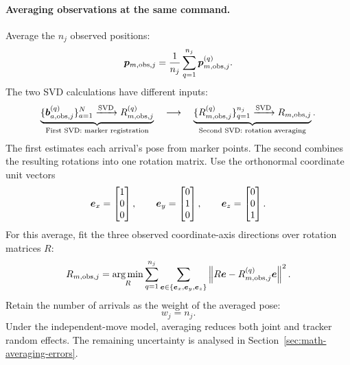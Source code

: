 \documentclass[../main.tex]{subfiles}
\begin{document}
\paragraph{Averaging observations at the same command.}
Average the $n_j$ observed positions:
\begin{equation*}
\bm{p}_{m,\mathrm{obs},j}
=\frac1{n_j}\sum_{q=1}^{n_j}\bm{p}_{m,\mathrm{obs},j}^{(q)}.
\end{equation*}
The two SVD calculations have different inputs:
\begin{equation*}
\underbrace{
\{\bm{b}_{a,\mathrm{obs},j}^{(q)}\}_{a=1}^{N}
\xrightarrow{\mathrm{SVD}}R_{m,\mathrm{obs},j}^{(q)}
}_{\text{First SVD: marker registration}}
\quad\longrightarrow\quad
\underbrace{
\{R_{m,\mathrm{obs},j}^{(q)}\}_{q=1}^{n_j}
\xrightarrow{\mathrm{SVD}}R_{m,\mathrm{obs},j}
}_{\text{Second SVD: rotation averaging}}.
\end{equation*}
The first estimates each arrival's pose from marker points. The second combines the resulting rotations into one rotation matrix. Use the orthonormal coordinate unit vectors
\begin{equation*}
\bm{e}_x=\begin{bmatrix}1\\0\\0\end{bmatrix},\qquad
\bm{e}_y=\begin{bmatrix}0\\1\\0\end{bmatrix},\qquad
\bm{e}_z=\begin{bmatrix}0\\0\\1\end{bmatrix}.
\end{equation*}
For this average, fit the three observed coordinate-axis directions over rotation matrices $R$:
\begin{equation*}
R_{m,\mathrm{obs},j}=\underset{R}{\arg\min}
\sum_{q=1}^{n_j}
\sum_{\bm{e}\in\{\bm{e}_x,\bm{e}_y,\bm{e}_z\}}
\left\|R\bm{e}-R_{m,\mathrm{obs},j}^{(q)}\bm{e}\right\|^2.
\end{equation*}
Retain the number of arrivals as the weight of the averaged pose:
\begin{equation*}
w_j=n_j.
\end{equation*}
Under the independent-move model, averaging reduces both joint and tracker random effects. The remaining uncertainty is analysed in Section~\ref{sec:math-averaging-errors}.
\end{document}
